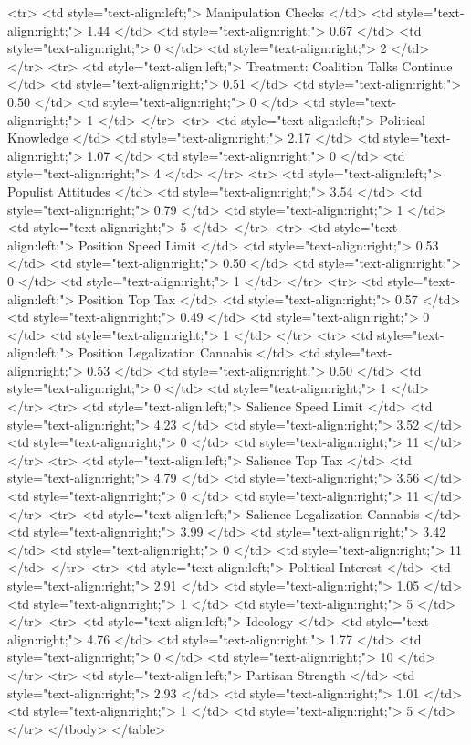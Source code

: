   <tr>
   <td style="text-align:left;"> Manipulation Checks </td>
   <td style="text-align:right;"> 1.44 </td>
   <td style="text-align:right;"> 0.67 </td>
   <td style="text-align:right;"> 0 </td>
   <td style="text-align:right;"> 2 </td>
  </tr>
  <tr>
   <td style="text-align:left;"> Treatment: Coalition Talks Continue </td>
   <td style="text-align:right;"> 0.51 </td>
   <td style="text-align:right;"> 0.50 </td>
   <td style="text-align:right;"> 0 </td>
   <td style="text-align:right;"> 1 </td>
  </tr>
  <tr>
   <td style="text-align:left;"> Political Knowledge </td>
   <td style="text-align:right;"> 2.17 </td>
   <td style="text-align:right;"> 1.07 </td>
   <td style="text-align:right;"> 0 </td>
   <td style="text-align:right;"> 4 </td>
  </tr>
  <tr>
   <td style="text-align:left;"> Populist Attitudes </td>
   <td style="text-align:right;"> 3.54 </td>
   <td style="text-align:right;"> 0.79 </td>
   <td style="text-align:right;"> 1 </td>
   <td style="text-align:right;"> 5 </td>
  </tr>
  <tr>
   <td style="text-align:left;"> Position Speed Limit </td>
   <td style="text-align:right;"> 0.53 </td>
   <td style="text-align:right;"> 0.50 </td>
   <td style="text-align:right;"> 0 </td>
   <td style="text-align:right;"> 1 </td>
  </tr>
  <tr>
   <td style="text-align:left;"> Position Top Tax </td>
   <td style="text-align:right;"> 0.57 </td>
   <td style="text-align:right;"> 0.49 </td>
   <td style="text-align:right;"> 0 </td>
   <td style="text-align:right;"> 1 </td>
  </tr>
  <tr>
   <td style="text-align:left;"> Position Legalization Cannabis </td>
   <td style="text-align:right;"> 0.53 </td>
   <td style="text-align:right;"> 0.50 </td>
   <td style="text-align:right;"> 0 </td>
   <td style="text-align:right;"> 1 </td>
  </tr>
  <tr>
   <td style="text-align:left;"> Salience Speed Limit </td>
   <td style="text-align:right;"> 4.23 </td>
   <td style="text-align:right;"> 3.52 </td>
   <td style="text-align:right;"> 0 </td>
   <td style="text-align:right;"> 11 </td>
  </tr>
  <tr>
   <td style="text-align:left;"> Salience Top Tax </td>
   <td style="text-align:right;"> 4.79 </td>
   <td style="text-align:right;"> 3.56 </td>
   <td style="text-align:right;"> 0 </td>
   <td style="text-align:right;"> 11 </td>
  </tr>
  <tr>
   <td style="text-align:left;"> Salience Legalization Cannabis </td>
   <td style="text-align:right;"> 3.99 </td>
   <td style="text-align:right;"> 3.42 </td>
   <td style="text-align:right;"> 0 </td>
   <td style="text-align:right;"> 11 </td>
  </tr>
  <tr>
   <td style="text-align:left;"> Political Interest </td>
   <td style="text-align:right;"> 2.91 </td>
   <td style="text-align:right;"> 1.05 </td>
   <td style="text-align:right;"> 1 </td>
   <td style="text-align:right;"> 5 </td>
  </tr>
  <tr>
   <td style="text-align:left;"> Ideology </td>
   <td style="text-align:right;"> 4.76 </td>
   <td style="text-align:right;"> 1.77 </td>
   <td style="text-align:right;"> 0 </td>
   <td style="text-align:right;"> 10 </td>
  </tr>
  <tr>
   <td style="text-align:left;"> Partisan Strength </td>
   <td style="text-align:right;"> 2.93 </td>
   <td style="text-align:right;"> 1.01 </td>
   <td style="text-align:right;"> 1 </td>
   <td style="text-align:right;"> 5 </td>
  </tr>
</tbody>
</table>
